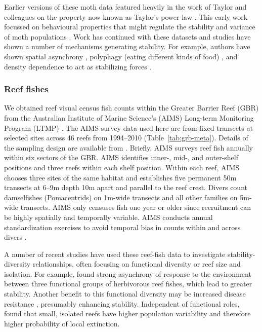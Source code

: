 Earlier versions of these moth data featured heavily in the work of
Taylor and colleagues on the property now known as Taylor's power law
\citep{taylor1977, taylor1980, perry1981}. This early work
focussed on behavioural properties that might regulate the stability and
variance of moth populations \citep{taylor1980}. Work has continued with
these datasets and studies have shown a number of mechanisms generating
stability. For example, authors have shown spatial asynchrony
\citep{gaston1988}, polyphagy (eating different kinds of food)
\citep{redfearn1988}, and density dependence to act as stabilizing forces
\citep{hanski1993}.

\subsubsection{Reef fishes}

We obtained reef visual census fish counts within the Greater Barrier Reef
(GBR) from the Australian Institute of Marine Science's (AIMS) Long-term
Monitoring Program (LTMP) \citep{sweatman2008}. The AIMS survey data used
here are from fixed transects at selected sites across 46 reefs from
1994--2010 (Table~\ref{tab:grb-meta}). Details of the sampling design are
available from \citet{halford1994}. Briefly, AIMS surveys reef fish
annually within six sectors of the GBR. AIMS identifies inner-, \mbox{mid-,}
and outer-shelf positions and three reefs within each shelf position. Within
each reef, AIMS chooses three sites of the same habitat and establishes five
permanent 50m transects at 6--9m depth 10m apart and parallel to the reef
crest. Divers count damselfishes (Pomacentrids) on 1m-wide transects and all
other families on 5m-wide transects. AIMS only censuses fish one year or older
since recruitment can be highly spatially and temporally variable. AIMS
conducts annual standardization exercises to avoid temporal bias in counts
within and across divers \citep{halford1994}.

A number of recent studies have used these reef-fish data to
investigate stability-diversity relationships, often focusing on functional
diversity or reef size and isolation. For example, \citet{thibaut2011}
found strong asynchrony of response to the environment between three functional
groups of herbivorous reef fishes, which lead to greater stability. Another
benefit to this functional diversity may be increased disease resistance
\citep{raymundo2009}, presumably enhancing stability. Independent of
functional roles, \citet{mellin2010} found that small, isolated reefs have
higher population variability and therefore higher probability of local
extinction.

